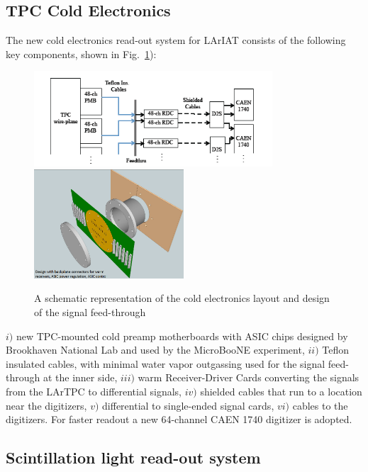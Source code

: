 \documentclass[DIV=calc, paper=a4, fontsize=10pt, twocolumn]{scrartcl}	 %
\begin{document}
{\subsection{TPC Cold Electronics}
The new cold electronics read-out system for LArIAT  consists of the following key components, shown in Fig.~\ref{fig:cold-elec}): 
\begin{figure}[h!]
\centering
\includegraphics[width=3.5in]{Figures/cold-elec-schematic}
\includegraphics[width=2.2in]{Figures/new-FT}
\caption{{\scriptsize \sf A schematic representation of the cold electronics layout and design of the signal feed-through} }
\label{fig:cold-elec} 
\end{figure}
$i)$ new TPC-mounted cold preamp motherboards with ASIC chips designed by Brookhaven National Lab and used by the MicroBooNE experiment, $ii)$ Teflon insulated cables, with minimal water vapor outgassing used for the signal feed-through at the inner side,  $iii)$ warm Receiver-Driver Cards converting the signals from the LArTPC to differential signals, $iv)$ shielded cables that run to a location near the digitizers, $v)$ differential to single-ended signal cards, $vi)$ cables to the digitizers. For faster readout a new 64-channel CAEN 1740 digitizer is adopted. 

\subsection{Scintillation light read-out system}

}
\end{document}
